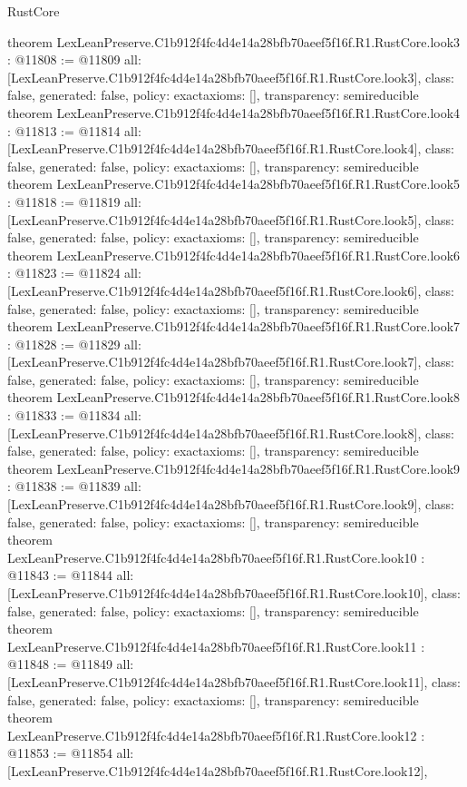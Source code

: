 \begin{lexlean}{RustCore}
\begin{coremodule}
{}
theorem LexLeanPreserve.C1b912f4fc4d4e14a28bfb70aeef5f16f.R1.RustCore.look3 : @11808 := @11809 {
  all: [LexLeanPreserve.C1b912f4fc4d4e14a28bfb70aeef5f16f.R1.RustCore.look3],
  class: false,
  generated: false,
  policy: exact{axioms: []},
  transparency: semireducible
}
theorem LexLeanPreserve.C1b912f4fc4d4e14a28bfb70aeef5f16f.R1.RustCore.look4 : @11813 := @11814 {
  all: [LexLeanPreserve.C1b912f4fc4d4e14a28bfb70aeef5f16f.R1.RustCore.look4],
  class: false,
  generated: false,
  policy: exact{axioms: []},
  transparency: semireducible
}
theorem LexLeanPreserve.C1b912f4fc4d4e14a28bfb70aeef5f16f.R1.RustCore.look5 : @11818 := @11819 {
  all: [LexLeanPreserve.C1b912f4fc4d4e14a28bfb70aeef5f16f.R1.RustCore.look5],
  class: false,
  generated: false,
  policy: exact{axioms: []},
  transparency: semireducible
}
theorem LexLeanPreserve.C1b912f4fc4d4e14a28bfb70aeef5f16f.R1.RustCore.look6 : @11823 := @11824 {
  all: [LexLeanPreserve.C1b912f4fc4d4e14a28bfb70aeef5f16f.R1.RustCore.look6],
  class: false,
  generated: false,
  policy: exact{axioms: []},
  transparency: semireducible
}
theorem LexLeanPreserve.C1b912f4fc4d4e14a28bfb70aeef5f16f.R1.RustCore.look7 : @11828 := @11829 {
  all: [LexLeanPreserve.C1b912f4fc4d4e14a28bfb70aeef5f16f.R1.RustCore.look7],
  class: false,
  generated: false,
  policy: exact{axioms: []},
  transparency: semireducible
}
theorem LexLeanPreserve.C1b912f4fc4d4e14a28bfb70aeef5f16f.R1.RustCore.look8 : @11833 := @11834 {
  all: [LexLeanPreserve.C1b912f4fc4d4e14a28bfb70aeef5f16f.R1.RustCore.look8],
  class: false,
  generated: false,
  policy: exact{axioms: []},
  transparency: semireducible
}
theorem LexLeanPreserve.C1b912f4fc4d4e14a28bfb70aeef5f16f.R1.RustCore.look9 : @11838 := @11839 {
  all: [LexLeanPreserve.C1b912f4fc4d4e14a28bfb70aeef5f16f.R1.RustCore.look9],
  class: false,
  generated: false,
  policy: exact{axioms: []},
  transparency: semireducible
}
theorem LexLeanPreserve.C1b912f4fc4d4e14a28bfb70aeef5f16f.R1.RustCore.look10 : @11843 := @11844 {
  all: [LexLeanPreserve.C1b912f4fc4d4e14a28bfb70aeef5f16f.R1.RustCore.look10],
  class: false,
  generated: false,
  policy: exact{axioms: []},
  transparency: semireducible
}
theorem LexLeanPreserve.C1b912f4fc4d4e14a28bfb70aeef5f16f.R1.RustCore.look11 : @11848 := @11849 {
  all: [LexLeanPreserve.C1b912f4fc4d4e14a28bfb70aeef5f16f.R1.RustCore.look11],
  class: false,
  generated: false,
  policy: exact{axioms: []},
  transparency: semireducible
}
theorem LexLeanPreserve.C1b912f4fc4d4e14a28bfb70aeef5f16f.R1.RustCore.look12 : @11853 := @11854 {
  all: [LexLeanPreserve.C1b912f4fc4d4e14a28bfb70aeef5f16f.R1.RustCore.look12],
}
\end{coremodule}
\end{lexlean}
